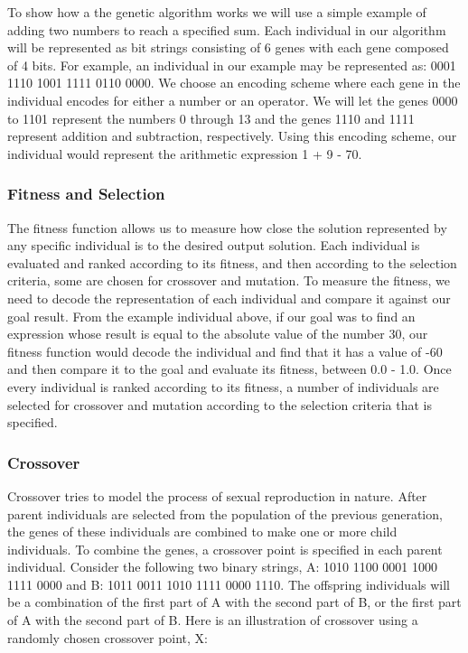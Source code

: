 To show how a the genetic algorithm works we will use a simple example of adding two numbers to reach a specified sum. 
Each individual in our algorithm will be represented as bit strings consisting of 6 genes with each gene composed of 4
bits. For example, an individual in our example may be represented as:  0001 1110 1001 1111 0110 0000. We choose an
encoding scheme where each gene in the individual encodes for either a number or an operator. We will let the genes 0000 to 
1101 represent the numbers 0 through 13 and the genes 1110 and 1111 represent addition and subtraction, respectively. Using 
this encoding scheme, our individual would represent the arithmetic expression 1 + 9 - 70.

\subsubsection{Fitness and Selection}
The fitness function allows us to measure how close the solution represented by any specific individual is to the desired 
output solution. Each individual is evaluated and ranked according to its fitness, and then according to the selection 
criteria, some are chosen for crossover and mutation. To measure the fitness, we need to decode the representation of each 
individual and compare it against our goal result. From the example individual above, if our goal was to find an expression 
whose result is equal to the absolute value of the number 30, our fitness function would decode the individual and find that 
it has a value of -60 and then compare it to the goal and evaluate its fitness, between 0.0 - 1.0. Once every individual is ranked according 
to its fitness, a number of individuals are selected for crossover and mutation according to the selection criteria that is specified.


\subsubsection{Crossover}
Crossover tries to model the process of sexual reproduction in nature. After parent individuals are selected from the 
population of the previous generation, the genes of these individuals are combined to make one or more child individuals. To 
combine the genes, a crossover point is specified in each parent individual. Consider the following two binary strings, A: 1010 1100 0001 1000 1111 0000 
and B: 1011 0011 1010 1111 0000 1110. The offspring individuals will be a combination of the first part of A with the second part of B, 
or the first part of A with the second part of B. Here is an illustration of crossover using a randomly chosen crossover point, X:


